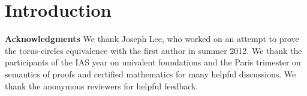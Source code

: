 \documentclass[conference, compsocconf]{drl-common/IEEEtran}
\begin{document}
\section{Introduction}










\medskip

\textbf{Acknowledgments} We thank Joseph Lee, who worked on an attempt
to prove the torus-circles equivalence with the first author in summer
2012.  We thank the participants of the IAS year on univalent
foundations and the Paris trimester on semantics of proofs and certified
mathematics for many helpful discussions.  We thank the anonymous
reviewers for helpful feedback.  

\setlength{\bibsep}{-1pt} %
{ \small


}
\end{document}
